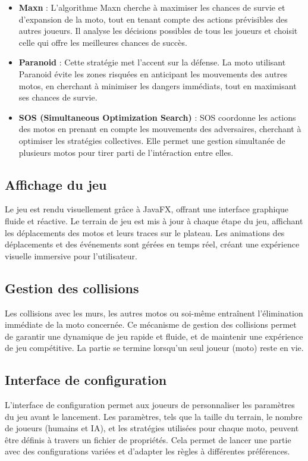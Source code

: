 \documentclass[a4paper,12pt]{article}
\begin{document}
\begin{itemize}
    \item \textbf{Maxn} : L'algorithme Maxn cherche à maximiser les chances de survie et d'expansion de la moto, tout en tenant compte des actions prévisibles des autres joueurs. Il analyse les décisions possibles de tous les joueurs et choisit celle qui offre les meilleures chances de succès.
    \item \textbf{Paranoid} : Cette stratégie met l'accent sur la défense. La moto utilisant Paranoid évite les zones risquées en anticipant les mouvements des autres motos, en cherchant à minimiser les dangers immédiats, tout en maximisant ses chances de survie.
    \item \textbf{SOS (Simultaneous Optimization Search)} : SOS coordonne les actions des motos en prenant en compte les mouvements des adversaires, cherchant à optimiser les stratégies collectives. Elle permet une gestion simultanée de plusieurs motos pour tirer parti de l'intéraction entre elles.
\end{itemize}

\subsection{Affichage du jeu}
Le jeu est rendu visuellement grâce à JavaFX, offrant une interface graphique fluide et réactive. Le terrain de jeu est mis à jour à chaque étape du jeu, affichant les déplacements des motos et leurs traces sur le plateau. Les animations des déplacements et des événements sont gérées en temps réel, créant une expérience visuelle immersive pour l'utilisateur.

\subsection{Gestion des collisions}
Les collisions avec les murs, les autres motos ou soi-même entraînent l’élimination immédiate de la moto concernée. Ce mécanisme de gestion des collisions permet de garantir une dynamique de jeu rapide et fluide, et de maintenir une expérience de jeu compétitive. La partie se termine lorsqu’un seul joueur (moto) reste en vie.

\subsection{Interface de configuration}
L'interface de configuration permet aux joueurs de personnaliser les paramètres du jeu avant le lancement. Les paramètres, tels que la taille du terrain, le nombre de joueurs (humains et IA), et les stratégies utilisées pour chaque moto, peuvent être définis à travers un fichier de propriétés. Cela permet de lancer une partie avec des configurations variées et d’adapter les règles à différentes préférences.
\end{document}
